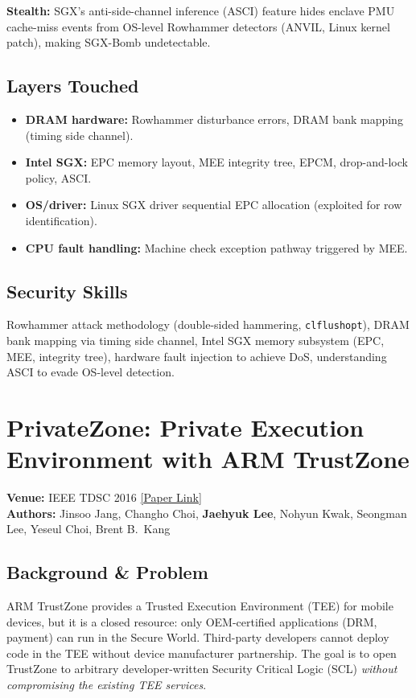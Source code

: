 \documentclass[11pt,letterpaper]{article}
\begin{document}
\textbf{Stealth:} SGX's anti-side-channel inference (ASCI) feature hides enclave PMU cache-miss events from OS-level Rowhammer detectors (ANVIL, Linux kernel patch), making SGX-Bomb undetectable.

\subsection*{Layers Touched}
\begin{itemize}
    \item \textbf{DRAM hardware:} Rowhammer disturbance errors, DRAM bank mapping (timing side channel).
    \item \textbf{Intel SGX:} EPC memory layout, MEE integrity tree, EPCM, drop-and-lock policy, ASCI.
    \item \textbf{OS/driver:} Linux SGX driver sequential EPC allocation (exploited for row identification).
    \item \textbf{CPU fault handling:} Machine check exception pathway triggered by MEE.
\end{itemize}

\subsection*{Security Skills}
Rowhammer attack methodology (double-sided hammering, \texttt{clflushopt}), DRAM bank mapping via timing side channel, Intel SGX memory subsystem (EPC, MEE, integrity tree), hardware fault injection to achieve DoS, understanding ASCI to evade OS-level detection.

\newpage

\section{PrivateZone: Private Execution Environment with ARM TrustZone}
\textbf{Venue:} IEEE TDSC 2016 \hfill
\href{https://cysec.kr/publications/PrivateZone_Providing_a_Private_Execution_Environment_using_ARM_TrustZone.pdf}{[Paper Link]}\\
\textbf{Authors:} Jinsoo Jang, Changho Choi, \textbf{Jaehyuk Lee}, Nohyun Kwak, Seongman Lee, Yeseul Choi, Brent B.\ Kang

\subsection*{Background \& Problem}
ARM TrustZone provides a Trusted Execution Environment (TEE) for mobile devices, but it is a closed resource: only OEM-certified applications (DRM, payment) can run in the Secure World.
Third-party developers cannot deploy code in the TEE without device manufacturer partnership.
The goal is to open TrustZone to arbitrary developer-written Security Critical Logic (SCL) \emph{without compromising the existing TEE services}.
\end{document}
